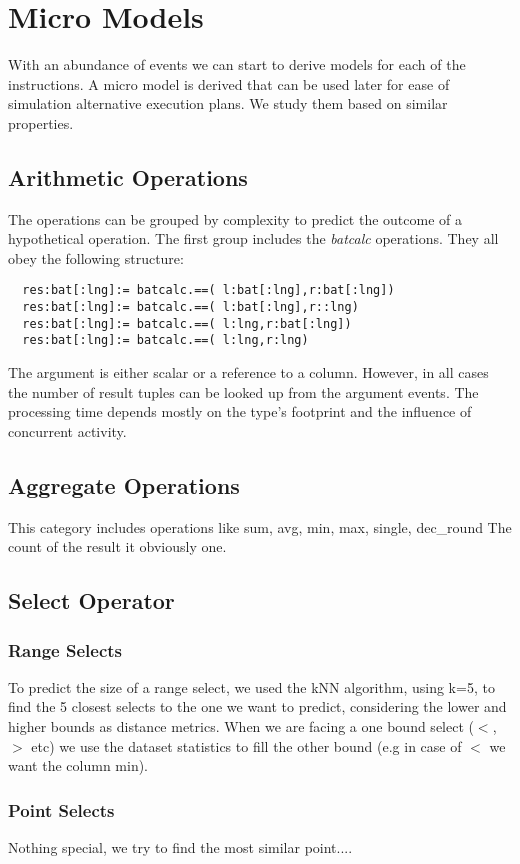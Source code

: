 \section{Micro Models}
With an abundance of events we can start to derive models for each of the instructions.
A micro model is derived that can be used later for ease of simulation
alternative execution plans. We study them based on similar properties.

\subsection{Arithmetic Operations}
The operations can be grouped by complexity to predict the outcome of a hypothetical operation.
The first group includes the {\em batcalc} operations.
They all obey the following structure:
\begin{verbatim}
  res:bat[:lng]:= batcalc.==( l:bat[:lng],r:bat[:lng])
  res:bat[:lng]:= batcalc.==( l:bat[:lng],r::lng)
  res:bat[:lng]:= batcalc.==( l:lng,r:bat[:lng])
  res:bat[:lng]:= batcalc.==( l:lng,r:lng)

\end{verbatim}
The argument is either scalar or a reference to a column.
However, in all cases the number of result tuples can be looked up from the argument events.
The processing time depends mostly on the type's footprint and the influence of concurrent activity.

\subsection{Aggregate Operations}
This category includes operations like sum, avg, min, max, single, dec\_round
The count of the result it obviously one.

\subsection{Select Operator}
\subsubsection{Range Selects}
To predict the size of a range select, we used the kNN algorithm,
using k=5, to find the 5 closest selects to the one we want to predict,
considering the lower and higher bounds as distance metrics.
When we are facing a one bound select ($<$,$>$ etc) we use the
dataset statistics to fill the other bound (e.g in case of $<$ we want the column min).
\subsubsection{Point Selects}
Nothing special, we try to find the most similar point....

